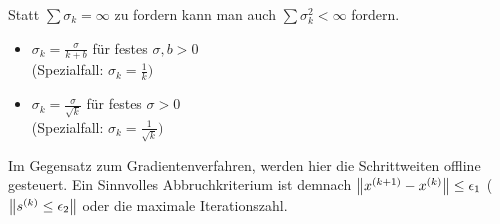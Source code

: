 \begin{Bemerkung}
 Statt $\sum \sigma_k = \infty$ zu fordern kann man auch $\sum \sigma_k^2 < \infty$ fordern.
\end{Bemerkung}

\begin{Beispiel}
\begin{itemize}
 \item $\sigma_k = \frac{\sigma}{k+b}$ für festes $\sigma,b>0$\\(Spezialfall: $\sigma_k = \frac{1}{k})$
 \item $\sigma_k = \frac{\sigma}{\sqrt{k}}$ für festes $\sigma>0$\\(Spezialfall: $\sigma_k = \frac{1}{\sqrt k})$
\end{itemize}
\end{Beispiel}

\begin{Bemerkung}
 Im Gegensatz zum Gradientenverfahren, werden hier die Schrittweiten offline gesteuert.
 Ein Sinnvolles Abbruchkriterium ist demnach $\left\lVert x^{(k+1)}-x^{(k)}\right\rVert\leq \epsilon_1$ ($\left\lVert s^{(k)} \leq 
\epsilon_2\right\rVert$ oder die maximale Iterationszahl.
\end{Bemerkung}

